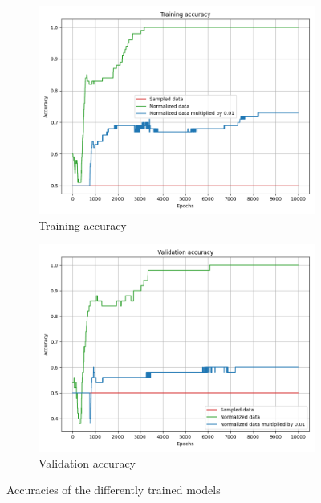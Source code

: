 \documentclass[a4paper,11pt]{article}
\begin{document}
\begin{figure}[ht]
    \centering
    \hfill
    \begin{subfigure}[b]{0.4\textwidth}
        \includegraphics[width=\textwidth]{../out/02_shallow/training_acc.png}
        \caption{Training accuracy}
    \end{subfigure}
    \hfill
    \begin{subfigure}[b]{0.4\textwidth}
        \includegraphics[width=\textwidth]{../out/02_shallow/validation_acc.png}
        \caption{Validation accuracy}
    \end{subfigure}
    \hfill
    \caption{Accuracies of the differently trained models}
    \label{fig:accuracy}
\end{figure}
\end{document}
